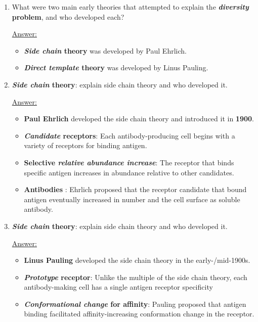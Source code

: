 \documentclass{article}
\newenvironment{QandA}{\begin{enumerate}[label=\bfseries Q\arabic*.]}
                       {\end{enumerate}}
\newenvironment{answered}{\par\normalfont\underline{Answer:}}{}
\begin{document}
\begin{QandA}
\begin{answered}
\begin{itemize}
    \end{itemize}
    \end{answered}
  \item{What were two main early theories that attempted to explain the \textbf{\textit{diversity} problem}, and who developed each?}
    \begin{answered}
    \begin{itemize}
      \item{\textbf{\textit{Side chain} theory} was developed by Paul Ehrlich.}
      \item{\textbf{\textit{Direct template} theory} was developed by Linus Pauling.}
    \end{itemize}
    \end{answered}
  \item{\textbf{\textit{Side chain} theory}: explain side chain theory and who developed it.}
    \begin{answered}
    \begin{itemize}
      \item{\textbf{Paul Ehrlich} developed the side chain theory and introduced it in \textbf{1900}.}
      \item{\textbf{\textit{Candidate} receptors}: Each antibody-producing cell begins with a variety of  receptors for binding antigen.}
      \item{\textbf{Selective \textit{relative abundance increase}}: The  receptor that binds specific antigen increases in abundance relative to other candidates.}
      \item{\textbf{Antibodies }: Ehrlich proposed that the receptor candidate that bound antigen eventually increased in number and  the cell surface as soluble antibody.}
    \end{itemize}
    \end{answered}
  \item{\textbf{\textit{Side chain} theory}: explain side chain theory and who developed it.}
    \begin{answered}
    \begin{itemize}
      \item{\textbf{Linus Pauling} developed the side chain theory in the early-/mid-1900s.}
      \item{\textbf{\textit{Prototype} receptor}: Unlike the multiple  of the side chain theory, each antibody-making cell has a single antigen receptor specificity }
      \item{\textbf{\textit{Conformational change} for affinity}: Pauling proposed that antigen binding facilitated affinity-increasing conformation change in the receptor.}

\end{itemize}
\end{answered}
\end{QandA}
\end{document}

